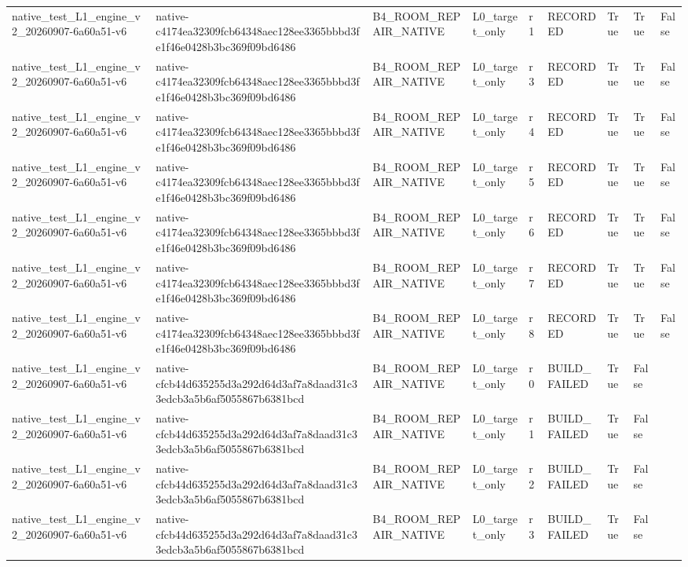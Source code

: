 \begin{tabular}{lllllllll}
native\_test\_L1\_engine\_v2\_20260907-6a60a51-v6 & native-c4174ea32309fcb64348aec128ee3365bbbd3fe1f46e0428b3bc369f09bd6486 & B4\_ROOM\_REPAIR\_NATIVE & L0\_target\_only & r1 & RECORDED & True & True & False \\
native\_test\_L1\_engine\_v2\_20260907-6a60a51-v6 & native-c4174ea32309fcb64348aec128ee3365bbbd3fe1f46e0428b3bc369f09bd6486 & B4\_ROOM\_REPAIR\_NATIVE & L0\_target\_only & r3 & RECORDED & True & True & False \\
native\_test\_L1\_engine\_v2\_20260907-6a60a51-v6 & native-c4174ea32309fcb64348aec128ee3365bbbd3fe1f46e0428b3bc369f09bd6486 & B4\_ROOM\_REPAIR\_NATIVE & L0\_target\_only & r4 & RECORDED & True & True & False \\
native\_test\_L1\_engine\_v2\_20260907-6a60a51-v6 & native-c4174ea32309fcb64348aec128ee3365bbbd3fe1f46e0428b3bc369f09bd6486 & B4\_ROOM\_REPAIR\_NATIVE & L0\_target\_only & r5 & RECORDED & True & True & False \\
native\_test\_L1\_engine\_v2\_20260907-6a60a51-v6 & native-c4174ea32309fcb64348aec128ee3365bbbd3fe1f46e0428b3bc369f09bd6486 & B4\_ROOM\_REPAIR\_NATIVE & L0\_target\_only & r6 & RECORDED & True & True & False \\
native\_test\_L1\_engine\_v2\_20260907-6a60a51-v6 & native-c4174ea32309fcb64348aec128ee3365bbbd3fe1f46e0428b3bc369f09bd6486 & B4\_ROOM\_REPAIR\_NATIVE & L0\_target\_only & r7 & RECORDED & True & True & False \\
native\_test\_L1\_engine\_v2\_20260907-6a60a51-v6 & native-c4174ea32309fcb64348aec128ee3365bbbd3fe1f46e0428b3bc369f09bd6486 & B4\_ROOM\_REPAIR\_NATIVE & L0\_target\_only & r8 & RECORDED & True & True & False \\
native\_test\_L1\_engine\_v2\_20260907-6a60a51-v6 & native-cfcb44d635255d3a292d64d3af7a8daad31c33edcb3a5b6af5055867b6381bcd & B4\_ROOM\_REPAIR\_NATIVE & L0\_target\_only & r0 & BUILD\_FAILED & True & False &  \\
native\_test\_L1\_engine\_v2\_20260907-6a60a51-v6 & native-cfcb44d635255d3a292d64d3af7a8daad31c33edcb3a5b6af5055867b6381bcd & B4\_ROOM\_REPAIR\_NATIVE & L0\_target\_only & r1 & BUILD\_FAILED & True & False &  \\
native\_test\_L1\_engine\_v2\_20260907-6a60a51-v6 & native-cfcb44d635255d3a292d64d3af7a8daad31c33edcb3a5b6af5055867b6381bcd & B4\_ROOM\_REPAIR\_NATIVE & L0\_target\_only & r2 & BUILD\_FAILED & True & False &  \\
native\_test\_L1\_engine\_v2\_20260907-6a60a51-v6 & native-cfcb44d635255d3a292d64d3af7a8daad31c33edcb3a5b6af5055867b6381bcd & B4\_ROOM\_REPAIR\_NATIVE & L0\_target\_only & r3 & BUILD\_FAILED & True & False &  \\

\end{tabular}
